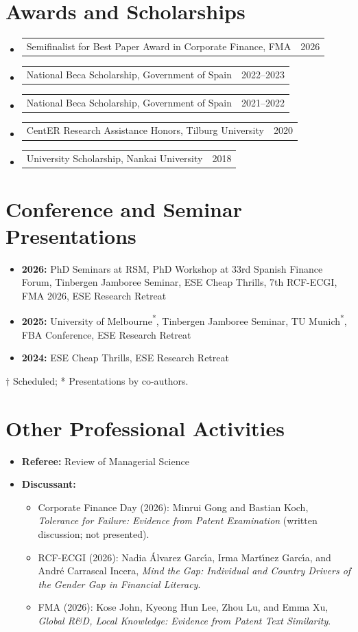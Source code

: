 \documentclass[11pt,letterpaper]{article}
\makeatletter
\newenvironment{cvbody}{\begin{list}{}{\setlength{\leftmargin}{1.4em}\setlength{\rightmargin}{0pt}\setlength{\topsep}{0pt}\setlength{\parsep}{4pt}}\item[]}{\end{list}}
\newcommand{\dated}[2]{\noindent\begin{tabularx}{\linewidth}{@{}Xr@{}}#1 & #2\end{tabularx}\par}
\newcommand{\coauthor}{\textsuperscript{*}}
\makeatother
\begin{document}
\section*{Awards and Scholarships}
\begin{itemize}
\item \dated{Semifinalist for Best Paper Award in Corporate Finance, FMA}{2026}
\item \dated{National Beca Scholarship, Government of Spain}{2022--2023}
\item \dated{National Beca Scholarship, Government of Spain}{2021--2022}
\item \dated{CentER Research Assistance Honors, Tilburg University}{2020}
\item \dated{University Scholarship, Nankai University}{2018}
\end{itemize}

\section*{Conference and Seminar Presentations}
\begin{itemize}
\item \textbf{2026:} PhD Seminars at RSM, PhD Workshop at 33rd Spanish Finance Forum, Tinbergen Jamboree Seminar, ESE Cheap Thrills, 7th RCF-ECGI, FMA 2026, ESE Research Retreat
\item \textbf{2025:} University of Melbourne\coauthor, Tinbergen Jamboree Seminar, TU Munich\coauthor, FBA Conference, ESE Research Retreat
\item \textbf{2024:} ESE Cheap Thrills, ESE Research Retreat
\end{itemize}
\begin{cvbody}
{\footnotesize \(\dagger\) Scheduled; * Presentations by co-authors.}
\end{cvbody}

\section*{Other Professional Activities}
\begin{itemize}
\item \textbf{Referee:} Review of Managerial Science
\item \textbf{Discussant:}
\begin{itemize}[leftmargin=1.4em,label=--]
\item Corporate Finance Day (2026): Minrui Gong and Bastian Koch, \textit{Tolerance for Failure: Evidence from Patent Examination} (written discussion; not presented).
\item RCF-ECGI (2026): Nadia \'{A}lvarez Garc\'{\i}a, Irma Mart\'{\i}nez Garc\'{\i}a, and Andr\'{e} Carrascal Incera, \textit{Mind the Gap: Individual and Country Drivers of the Gender Gap in Financial Literacy}.
\item FMA (2026): Kose John, Kyeong Hun Lee, Zhou Lu, and Emma Xu, \textit{Global R\&D, Local Knowledge: Evidence from Patent Text Similarity}.
\end{itemize}
\end{itemize}
\end{document}
